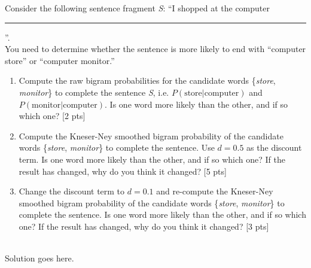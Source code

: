     Consider the following sentence fragment \emph{S}: ``I shopped at the computer \rule{1cm}{0.15mm}''. \\
    You need to determine whether the sentence is more likely to end with ``computer store'' or ``computer monitor.'' \\
    \begin{enumerate}
        \item 
        Compute the raw bigram probabilities for the candidate words \{\emph{store}, \emph{monitor}\} to complete the sentence \emph{S}, i.e. $P(\text{store} | \text{computer})$ and $P(\text{monitor} | \text{computer})$.
        Is one word more likely than the other, and if so which one? [2 pts]
        \item Compute the Kneser-Ney smoothed bigram probability of the candidate words \{\emph{store}, \emph{monitor}\} to complete the sentence.
        Use $d=0.5$ as the discount term.
        Is one word more likely than the other, and if so which one?
        If the result has changed, why do you think it changed? [5 pts]
        \item Change the discount term to $d=0.1$ and re-compute the Kneser-Ney smoothed bigram probability of the candidate words \{\emph{store}, \emph{monitor}\} to complete the sentence.
        Is one word more likely than the other, and if so which one?
        If the result has changed, why do you think it changed? [3 pts]
    \end{enumerate}

\begin{solution} \ \\
Solution goes here.
\end{solution}